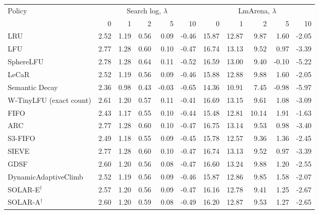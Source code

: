 \begin{tabular}{lrrrrr|rrrrr}
\toprule
Policy & \multicolumn{5}{c|}{Search log, $\lambda$} & \multicolumn{5}{c}{LmArena, $\lambda$}\\
 & 0 & 1 & 2 & 5 & 10 & 0 & 1 & 2 & 5 & 10\\
\midrule
LRU & 2.52 & 1.19 & 0.56 & 0.09 & -0.46 & 15.87 & 12.87 & 9.87 & 1.60 & -2.05\\
LFU & 2.77 & 1.28 & 0.60 & 0.10 & -0.47 & 16.74 & 13.13 & 9.52 & 0.97 & -3.39\\
SphereLFU & 2.78 & 1.28 & 0.64 & 0.11 & -0.52 & 16.59 & 13.00 & 9.40 & -0.10 & -5.22\\
LeCaR & 2.52 & 1.19 & 0.56 & 0.09 & -0.46 & 15.88 & 12.88 & 9.88 & 1.60 & -2.05\\
Semantic Decay & 2.36 & 0.98 & 0.43 & -0.03 & -0.65 & 14.36 & 10.91 & 7.45 & -0.98 & -5.97\\
W-TinyLFU (exact count) & 2.61 & 1.20 & 0.57 & 0.11 & -0.41 & 16.69 & 13.15 & 9.61 & 1.08 & -3.09\\
FIFO & 2.43 & 1.17 & 0.55 & 0.10 & -0.44 & 15.48 & 12.81 & 10.14 & 1.91 & -1.63\\
ARC & 2.77 & 1.28 & 0.60 & 0.10 & -0.47 & 16.75 & 13.14 & 9.53 & 0.98 & -3.40\\
S3-FIFO & 2.49 & 1.18 & 0.55 & 0.09 & -0.45 & 15.78 & 12.57 & 9.36 & 1.36 & -2.45\\
SIEVE & 2.77 & 1.28 & 0.60 & 0.10 & -0.47 & 16.74 & 13.13 & 9.52 & 0.97 & -3.39\\
GDSF & 2.60 & 1.20 & 0.56 & 0.08 & -0.47 & 16.60 & 13.24 & 9.88 & 1.20 & -2.55\\
DynamicAdaptiveClimb & 2.52 & 1.19 & 0.56 & 0.09 & -0.46 & 15.87 & 12.86 & 9.85 & 1.58 & -2.07\\
SOLAR-E$^{\dagger}$ & 2.57 & 1.20 & 0.56 & 0.09 & -0.47 & 16.16 & 12.78 & 9.41 & 1.25 & -2.67\\
SOLAR-A$^{\dagger}$ & 2.60 & 1.20 & 0.59 & 0.08 & -0.49 & 16.20 & 12.87 & 9.53 & 1.27 & -2.65\\

\end{tabular}

